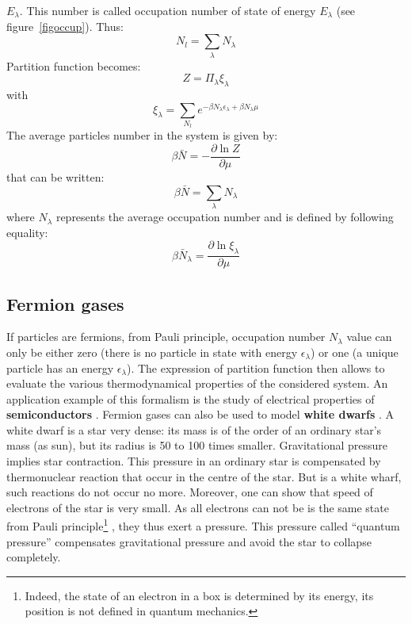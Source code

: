 \documentclass[12pt]{book}
\begin{document}
$E_\lambda$. This number is called occupation number of state of
energy $E_\lambda$ (see
figure~\ref{figoccup}). Thus:
\begin{equation}
N_l=\sum_\lambda N_\lambda
\end{equation}
Partition function becomes:
\begin{equation}
Z=\Pi_\lambda \xi_\lambda
\end{equation}
with
\begin{equation}
\xi_\lambda=\sum_{N_l}e^{-\beta N_\lambda\epsilon_\lambda+\beta
N_\lambda\mu} 
\end{equation}
The average particles number in the system is given by:
\begin{equation}
\beta \bar N=-\frac{\partial \ln Z}{\partial \mu}
\end{equation}
that can be written:
\begin{equation}
\beta \bar N=\sum_\lambda N_\lambda
\end{equation}
where $N_\lambda$ represents the average occupation number and is defined by
following equality: 
\begin{equation}
\beta \bar N_\lambda=\frac{\partial \ln \xi_\lambda}{\partial \mu}
\end{equation}

\subsection{Fermion gases}
If particles are fermions, from Pauli 
principle, occupation number $N_\lambda$ value can
only be either zero (there is no particle in state with energy
$\epsilon_\lambda$) or one (a unique particle has an energy
$\epsilon_\lambda$). 
The expression of partition function then allows to evaluate the various
thermodynamical  properties of the considered system. An application example of
this formalism is the study of  electrical
properties of {\bf
  semiconductors}\cite{ph:physt:Diu89}
.
Fermion gases can also be used to model {\bf white dwarfs}
.
A white dwarf is a star \cite{ph:physt:Diu89} very dense: its mass is of the
order of an ordinary star's mass
(as sun), but its radius is
50 to 100 times smaller.
Gravitational pressure implies star contraction. This pressure in an ordinary
star is compensated by thermonuclear reaction that occur in the centre of the
star. But is a white wharf, such reactions do not occur no more. Moreover, one
can show that speed of electrons of the star is very small. As all electrons
can not be is the same state from Pauli principle\footnote{%
Indeed, the state of an electron in a box is determined by its energy, its
position is not defined in quantum mechanics.}%
, they thus exert a pressure. This pressure called ``quantum pressure''
compensates gravitational pressure and avoid the star to collapse completely.
\end{document}

